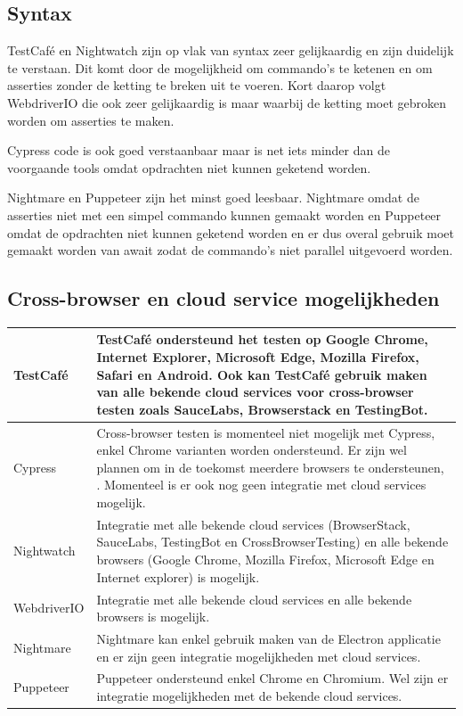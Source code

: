 \subsection{Syntax}
TestCafé en Nightwatch zijn op vlak van syntax zeer gelijkaardig en zijn duidelijk te verstaan. Dit komt door de mogelijkheid om commando's te ketenen en om \glspl{assertie} zonder de ketting te breken uit te voeren. Kort daarop volgt WebdriverIO die ook zeer gelijkaardig is maar waarbij de ketting moet gebroken worden om \glspl{assertie} te maken.

Cypress code is ook goed verstaanbaar maar is net iets minder dan de voorgaande \glspl{tool} omdat opdrachten niet kunnen geketend worden.

Nightmare en Puppeteer zijn het minst goed leesbaar. Nightmare omdat de \glspl{assertie} niet met een simpel commando kunnen gemaakt worden en Puppeteer omdat de opdrachten niet kunnen geketend worden en er dus overal gebruik moet gemaakt worden van await zodat de commando's niet parallel uitgevoerd worden.

\subsection{Cross-browser en cloud service mogelijkheden}
\begin{tabular}{ | l | p{12cm} | }
\hline
 TestCafé & TestCafé ondersteund het testen op Google Chrome, Internet Explorer, Microsoft Edge, Mozilla Firefox, Safari en Android. Ook kan TestCafé gebruik maken van alle bekende cloud services voor cross-browser testen zoals SauceLabs, Browserstack en TestingBot.\\
\hline
 Cypress & Cross-browser testen is momenteel niet mogelijk met Cypress, enkel Chrome varianten worden ondersteund. Er zijn wel plannen om in de toekomst meerdere browsers te ondersteunen, \textcite{Mann2017}. Momenteel is er ook nog geen integratie met cloud services mogelijk.\\
\hline
 Nightwatch & Integratie met alle bekende cloud services (BrowserStack, SauceLabs, TestingBot en CrossBrowserTesting) en alle bekende browsers (Google Chrome, Mozilla Firefox, Microsoft Edge en Internet explorer) is mogelijk.\\
\hline
 WebdriverIO & Integratie met alle bekende cloud services en alle bekende browsers is mogelijk.\\
\hline
 Nightmare & Nightmare kan enkel gebruik maken van de Electron applicatie en er zijn geen integratie mogelijkheden met cloud services.\\
\hline
 Puppeteer & Puppeteer ondersteund enkel Chrome en Chromium. Wel zijn er integratie mogelijkheden met de bekende cloud services.\\
\hline
\end{tabular}

